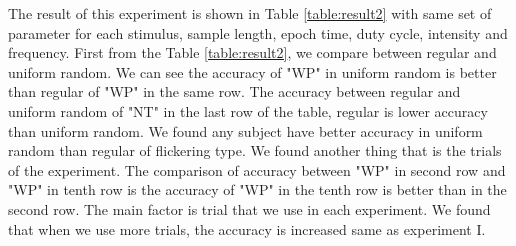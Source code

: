 The result of this experiment is shown in Table \ref{table:result2} with same set of parameter for each stimulus, sample length, epoch time, duty cycle, intensity and frequency. First from the Table \ref{table:result2}, we compare between regular and uniform random. We can see the accuracy of "WP" in uniform random is better than regular of "WP" in the same row. The accuracy between regular and uniform random of "NT" in the last row of the table, regular is lower accuracy than uniform random. We found any subject have better accuracy in uniform random than regular of flickering type. We found another thing that is the trials of the experiment. The comparison of accuracy between "WP" in second row and "WP" in tenth row is the accuracy of "WP" in the tenth row is better than in the second row. The main factor is trial that we use in each experiment. We found that when we use more trials, the accuracy is increased same as experiment I.

